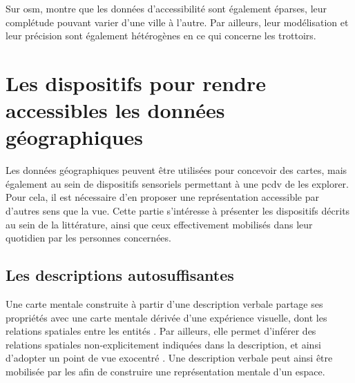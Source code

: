 
Sur \gls{osm}, \cite{Mobasheri2017} montre que les données d'accessibilité sont également éparses, leur complétude pouvant varier d'une ville à l'autre. Par ailleurs, leur modélisation et leur précision sont également hétérogènes \cite{Biagi2020} en ce qui concerne les trottoirs.


\section{Les dispositifs pour rendre accessibles les données géographiques}


Les données géographiques peuvent être utilisées pour concevoir des cartes, mais également au sein de dispositifs sensoriels permettant à une \gls{pcdv} de les explorer. Pour cela, il est nécessaire d'en proposer une représentation accessible par d'autres sens que la vue. Cette partie s'intéresse à présenter les dispositifs décrits au sein de la littérature, ainsi que ceux effectivement mobilisés dans leur quotidien par les personnes concernées.

\subsection{Les descriptions autosuffisantes}

\label{ea_description_autosuffisante}




Une carte mentale construite à partir d'une description verbale partage ses propriétés avec une carte mentale dérivée d'une expérience visuelle, dont les relations spatiales entre les entités \cite{Denis1992}. Par ailleurs, elle permet d'inférer des relations spatiales non-explicitement indiquées dans la description, et ainsi d'adopter un point de vue exocentré \cite{Avraamides2004}. Une description verbale peut ainsi être mobilisée par les \pcdvs{} afin de construire une représentation mentale d'un espace.

